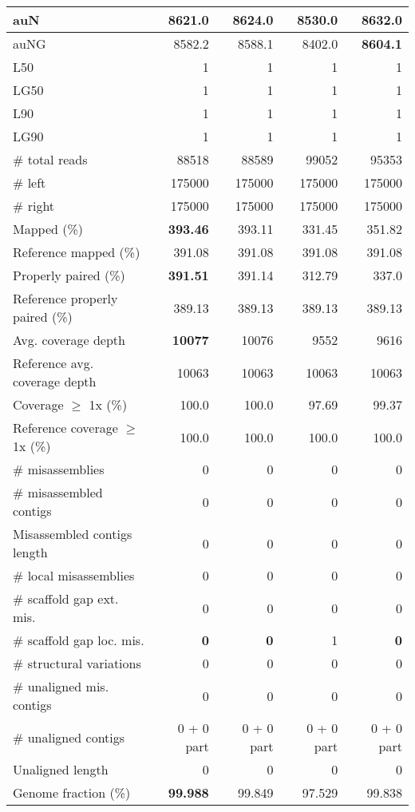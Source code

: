 \documentclass[12pt,a4paper]{article}
\begin{document}
\begin{table}[ht]
\begin{center}
\begin{tabular}{|l*{4}{|r}|}
auN & 8621.0 & 8624.0 & 8530.0 & {\bf 8632.0} \\ \hline
auNG & 8582.2 & 8588.1 & 8402.0 & {\bf 8604.1} \\ \hline
L50 & 1 & 1 & 1 & 1 \\ \hline
LG50 & 1 & 1 & 1 & 1 \\ \hline
L90 & 1 & 1 & 1 & 1 \\ \hline
LG90 & 1 & 1 & 1 & 1 \\ \hline
\# total reads & 88518 & 88589 & 99052 & 95353 \\ \hline
\# left & 175000 & 175000 & 175000 & 175000 \\ \hline
\# right & 175000 & 175000 & 175000 & 175000 \\ \hline
Mapped (\%) & {\bf 393.46} & 393.11 & 331.45 & 351.82 \\ \hline
Reference mapped (\%) & 391.08 & 391.08 & 391.08 & 391.08 \\ \hline
Properly paired (\%) & {\bf 391.51} & 391.14 & 312.79 & 337.0 \\ \hline
Reference properly paired (\%) & 389.13 & 389.13 & 389.13 & 389.13 \\ \hline
Avg. coverage depth & {\bf 10077} & 10076 & 9552 & 9616 \\ \hline
Reference avg. coverage depth & 10063 & 10063 & 10063 & 10063 \\ \hline
Coverage $\geq$ 1x (\%) & 100.0 & 100.0 & 97.69 & 99.37 \\ \hline
Reference coverage $\geq$ 1x (\%) & 100.0 & 100.0 & 100.0 & 100.0 \\ \hline
\# misassemblies & 0 & 0 & 0 & 0 \\ \hline
\# misassembled contigs & 0 & 0 & 0 & 0 \\ \hline
Misassembled contigs length & 0 & 0 & 0 & 0 \\ \hline
\# local misassemblies & 0 & 0 & 0 & 0 \\ \hline
\# scaffold gap ext. mis. & 0 & 0 & 0 & 0 \\ \hline
\# scaffold gap loc. mis. & {\bf 0} & {\bf 0} & 1 & {\bf 0} \\ \hline
\# structural variations & 0 & 0 & 0 & 0 \\ \hline
\# unaligned mis. contigs & 0 & 0 & 0 & 0 \\ \hline
\# unaligned contigs & 0 + 0 part & 0 + 0 part & 0 + 0 part & 0 + 0 part \\ \hline
Unaligned length & 0 & 0 & 0 & 0 \\ \hline
Genome fraction (\%) & {\bf 99.988} & 99.849 & 97.529 & 99.838 \\ \hline

\end{tabular}
\end{center}
\end{table}
\end{document}
